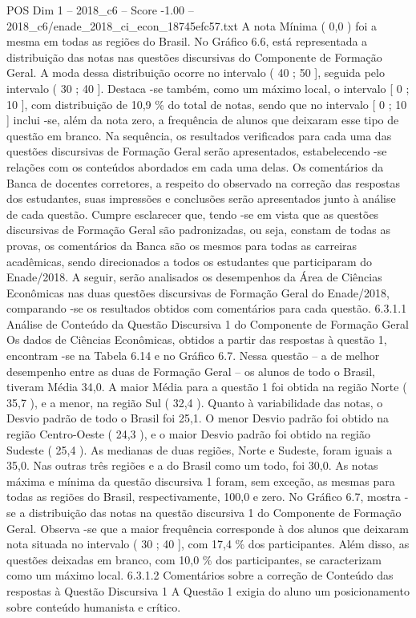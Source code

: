 \begin{textsample}{POS Dim 1 – 2018\_c6 – Score -1.00 – 2018\_c6/enade\_2018\_ci\_econ\_18745efc57.txt}
A nota Mínima ( 0,0 ) foi a mesma em todas as regiões do Brasil.
No Gráfico 6.6, está representada a distribuição das notas nas questões discursivas do Componente de Formação Geral.
A moda dessa distribuição ocorre no intervalo ( 40 ; 50 ], seguida pelo intervalo ( 30 ; 40 ].
Destaca -se também, como um máximo local, o intervalo [ 0 ; 10 ], com distribuição de 10,9 \% do total de notas, sendo que no intervalo [ 0 ; 10 ] inclui -se, além da nota zero, a frequência de alunos que deixaram esse tipo de questão em branco.
Na sequência, os resultados verificados para cada uma das questões discursivas de Formação Geral serão apresentados, estabelecendo -se relações com os conteúdos abordados em cada uma delas.
Os comentários da Banca de docentes corretores, a respeito do observado na correção das respostas dos estudantes, suas impressões e conclusões serão apresentados junto à análise de cada questão.
Cumpre esclarecer que, tendo -se em vista que as questões discursivas de Formação Geral são padronizadas, ou seja, constam de todas as provas, os comentários da Banca são os mesmos para todas as carreiras acadêmicas, sendo direcionados a todos os estudantes que participaram do Enade/2018.
A seguir, serão analisados os desempenhos da Área de Ciências Econômicas nas duas questões discursivas de Formação Geral do Enade/2018, comparando -se os resultados obtidos com comentários para cada questão. 6.3.1.1 Análise de Conteúdo da Questão Discursiva 1 do Componente de Formação Geral Os dados de Ciências Econômicas, obtidos a partir das respostas à questão 1, encontram -se na Tabela 6.14 e no Gráfico 6.7.
Nessa questão – a de melhor desempenho entre as duas de Formação Geral – os alunos de todo o Brasil, tiveram Média 34,0.
A maior Média para a questão 1 foi obtida na região Norte ( 35,7 ), e a menor, na região Sul ( 32,4 ).
Quanto à variabilidade das notas, o Desvio padrão de todo o Brasil foi 25,1.
O menor Desvio padrão foi obtido na região Centro-Oeste ( 24,3 ), e o maior Desvio padrão foi obtido na região Sudeste ( 25,4 ).
As medianas de duas regiões, Norte e Sudeste, foram iguais a 35,0.
Nas outras três regiões e a do Brasil como um todo, foi 30,0.
As notas máxima e mínima da questão discursiva 1 foram, sem exceção, as mesmas para todas as regiões do Brasil, respectivamente, 100,0 e zero.
No Gráfico 6.7, mostra -se a distribuição das notas na questão discursiva 1 do Componente de Formação Geral.
Observa -se que a maior frequência corresponde à dos alunos que deixaram nota situada no intervalo ( 30 ; 40 ], com 17,4 \% dos participantes.
Além disso, as questões deixadas em branco, com 10,0 \% dos participantes, se caracterizam como um máximo local. 6.3.1.2 Comentários sobre a correção de Conteúdo das respostas à Questão Discursiva 1 A Questão 1 exigia do aluno um posicionamento sobre conteúdo humanista e crítico.

\end{textsample}
